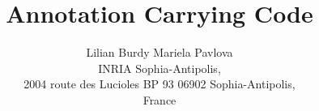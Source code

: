 \documentclass[pagenumbers]{ieee}
\begin{document}
\title{ Annotation Carrying Code }
\author{Lilian Burdy  Mariela Pavlova\\
INRIA Sophia-Antipolis,\\ 2004 route des Lucioles BP 93
06902 Sophia-Antipolis,\\  France}


\maketitle
\thispagestyle{empty}
\begin{abstract}

\end{abstract}








%




\end{document}
